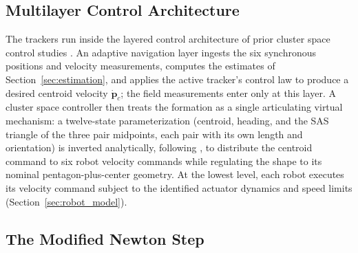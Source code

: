 \documentclass[lettersize,journal]{IEEEtran}
\begin{document}
\subsection{Multilayer Control Architecture}
\label{sec:arch}

The trackers run inside the layered control architecture of prior
cluster space control studies \cite{14,30}. An adaptive navigation
layer ingests the six synchronous positions and velocity measurements,
computes the estimates of Section~\ref{sec:estimation}, and applies
the active tracker's control law to produce a desired centroid velocity
$\dot{\mathbf{p}}_c$; the field measurements enter
only at this layer. A cluster space controller then treats the
formation as a single articulating virtual mechanism: a twelve-state
parameterization (centroid, heading, and the SAS triangle of the three
pair midpoints, each pair with its own length and orientation) is
inverted analytically, following \cite{14,30}, to distribute the
centroid command to six robot velocity commands while regulating the
shape to its nominal pentagon-plus-center geometry. At the lowest
level, each robot executes its velocity command subject to the
identified actuator dynamics and speed limits
(Section~\ref{sec:robot_model}).

\subsection{The Modified Newton Step}
\label{sec:mod_newton}
\end{document}
